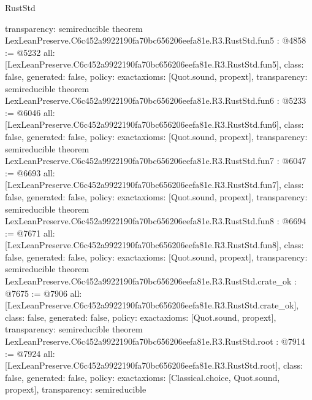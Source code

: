 \begin{lexlean}{RustStd}
\begin{coremodule}
{  transparency: semireducible
}
theorem LexLeanPreserve.C6c452a9922190fa70bc656206eefa81e.R3.RustStd.fun5 : @4858 := @5232 {
  all: [LexLeanPreserve.C6c452a9922190fa70bc656206eefa81e.R3.RustStd.fun5],
  class: false,
  generated: false,
  policy: exact{axioms: [Quot.sound, propext]},
  transparency: semireducible
}
theorem LexLeanPreserve.C6c452a9922190fa70bc656206eefa81e.R3.RustStd.fun6 : @5233 := @6046 {
  all: [LexLeanPreserve.C6c452a9922190fa70bc656206eefa81e.R3.RustStd.fun6],
  class: false,
  generated: false,
  policy: exact{axioms: [Quot.sound, propext]},
  transparency: semireducible
}
theorem LexLeanPreserve.C6c452a9922190fa70bc656206eefa81e.R3.RustStd.fun7 : @6047 := @6693 {
  all: [LexLeanPreserve.C6c452a9922190fa70bc656206eefa81e.R3.RustStd.fun7],
  class: false,
  generated: false,
  policy: exact{axioms: [Quot.sound, propext]},
  transparency: semireducible
}
theorem LexLeanPreserve.C6c452a9922190fa70bc656206eefa81e.R3.RustStd.fun8 : @6694 := @7671 {
  all: [LexLeanPreserve.C6c452a9922190fa70bc656206eefa81e.R3.RustStd.fun8],
  class: false,
  generated: false,
  policy: exact{axioms: [Quot.sound, propext]},
  transparency: semireducible
}
theorem LexLeanPreserve.C6c452a9922190fa70bc656206eefa81e.R3.RustStd.crate_ok : @7675 := @7906 {
  all: [LexLeanPreserve.C6c452a9922190fa70bc656206eefa81e.R3.RustStd.crate_ok],
  class: false,
  generated: false,
  policy: exact{axioms: [Quot.sound, propext]},
  transparency: semireducible
}
theorem LexLeanPreserve.C6c452a9922190fa70bc656206eefa81e.R3.RustStd.root : @7914 := @7924 {
  all: [LexLeanPreserve.C6c452a9922190fa70bc656206eefa81e.R3.RustStd.root],
  class: false,
  generated: false,
  policy: exact{axioms: [Classical.choice, Quot.sound, propext]},
  transparency: semireducible
}


\end{coremodule}
\end{lexlean}
